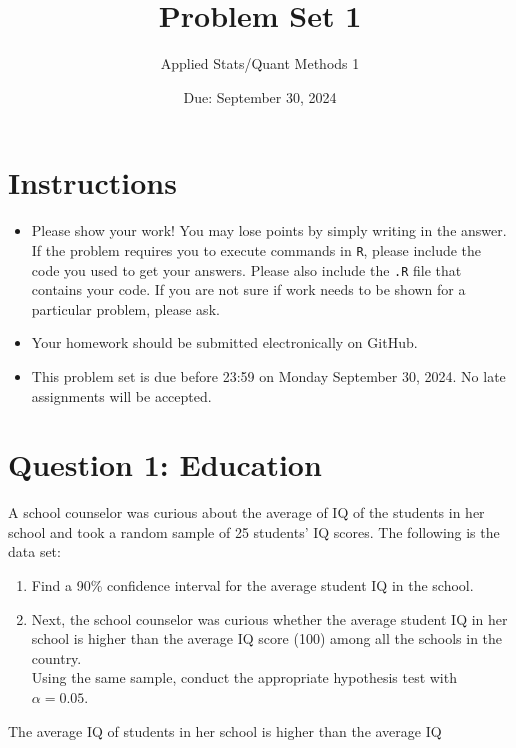 \documentclass[12pt,letterpaper]{article}
\title{Problem Set 1}
\date{Due: September 30, 2024}
\author{Applied Stats/Quant Methods 1}
\begin{document}
	\maketitle
	
	\section*{Instructions}
	\begin{itemize}
	\item Please show your work! You may lose points by simply writing in the answer. If the problem requires you to execute commands in \texttt{R}, please include the code you used to get your answers. Please also include the \texttt{.R} file that contains your code. If you are not sure if work needs to be shown for a particular problem, please ask.
\item Your homework should be submitted electronically on GitHub.
\item This problem set is due before 23:59 on Monday September 30, 2024. No late assignments will be accepted.
	\end{itemize}
	
	\vspace{1cm}
	\section*{Question 1: Education}

A school counselor was curious about the average of IQ of the students in her school and took a random sample of 25 students' IQ scores. The following is the data set:\\

\begin{enumerate}
	\item Find a 90\% confidence interval for the average student IQ in the school.
     
	\item Next, the school counselor was curious  whether  the average student IQ in her school is higher than the average IQ score (100) among all the schools in the country.\\ 
	\noindent Using the same sample, conduct the appropriate hypothesis test with $\alpha=0.05$.
		  
\end{enumerate}
      The average IQ of students in her school is higher than the average IQ\\
\newpage
\end{document}
